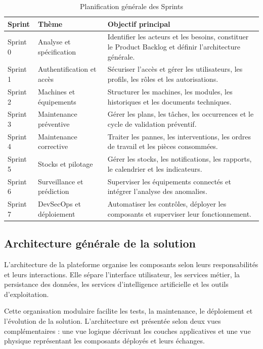 \begin{table}[H]
\centering
\caption{Planification générale des Sprints}
\label{tab:planification-sprints}
\small
\begin{tabularx}{\textwidth}{|p{1.7cm}|p{4.7cm}|X|}
\hline
\textbf{Sprint} & \textbf{Thème} & \textbf{Objectif principal} \\
\hline
Sprint 0 & Analyse et spécification & Identifier les acteurs et les besoins, constituer le Product Backlog et définir l’architecture générale. \\
\hline
Sprint 1 & Authentification et accès & Sécuriser l’accès et gérer les utilisateurs, les profils, les rôles et les autorisations. \\
\hline
Sprint 2 & Machines et équipements & Structurer les machines, les modules, les historiques et les documents techniques. \\
\hline
Sprint 3 & Maintenance préventive & Gérer les plans, les tâches, les occurrences et le cycle de validation préventif. \\
\hline
Sprint 4 & Maintenance corrective & Traiter les pannes, les interventions, les ordres de travail et les pièces consommées. \\
\hline
Sprint 5 & Stocks et pilotage & Gérer les stocks, les notifications, les rapports, le calendrier et les indicateurs. \\
\hline
Sprint 6 & Surveillance et prédiction & Superviser les équipements connectés et intégrer l’analyse des anomalies. \\
\hline
Sprint 7 & DevSecOps et déploiement & Automatiser les contrôles, déployer les composants et superviser leur fonctionnement. \\
\hline
\end{tabularx}
\end{table}

\subsection{Architecture générale de la solution}

L’architecture de la plateforme organise les composants selon leurs responsabilités et leurs interactions. Elle sépare l’interface utilisateur, les services métier, la persistance des données, les services d’intelligence artificielle et les outils d’exploitation.

Cette organisation modulaire facilite les tests, la maintenance, le déploiement et l’évolution de la solution. L’architecture est présentée selon deux vues complémentaires : une vue logique décrivant les couches applicatives et une vue physique représentant les composants déployés et leurs échanges.

